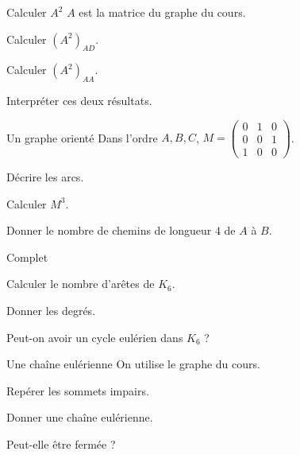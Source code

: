 \begingroup\renewcommand{\otBesoinPlace}[1]{}\begin{minipage}{\linewidth}
\begin{exercice}[2]{Calculer $A^2$}
$A$ est la matrice du graphe du cours.
\begin{questions}
\item Calculer $(A^2)_{AD}$.
\item Calculer $(A^2)_{AA}$.
\item Interpréter ces deux résultats.
\end{questions}
\end{exercice}
\begin{exercice}[2]{Un graphe orienté}
Dans l’ordre $A,B,C$, $M=\begin{pmatrix}0&1&0\\0&0&1\\1&0&0\end{pmatrix}$.
\begin{questions}
\item Décrire les arcs.
\item Calculer $M^3$.
\item Donner le nombre de chemins de longueur $4$ de $A$ à $B$.
\end{questions}
\end{exercice}
\begin{exercice}[2]{Complet}

\begin{questions}
\item Calculer le nombre d’arêtes de $K_6$.
\item Donner les degrés.
\item Peut-on avoir un cycle eulérien dans $K_6$ ?
\end{questions}
\end{exercice}
\begin{exercice}[2]{Une chaîne eulérienne}
On utilise le graphe du cours.
\begin{questions}
\item Repérer les sommets impairs.
\item Donner une chaîne eulérienne.
\item Peut-elle être fermée ?
\end{questions}
\end{exercice}
\end{minipage}\endgroup
\clearpage
{}
